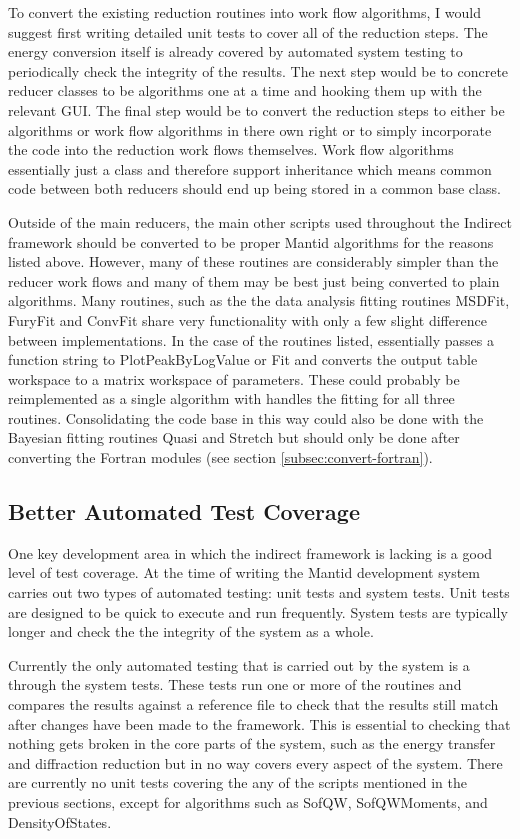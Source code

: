 \documentclass[paper=a4, fontsize=11pt]{scrartcl}	%
\numberwithin{equation}{section}															%
\numberwithin{figure}{section}																%
\numberwithin{table}{section}																%
\begin{document}
To convert the existing reduction routines into work flow algorithms, I would suggest first writing detailed unit tests to cover all of the reduction steps. The energy conversion itself is already covered by automated system testing to periodically check the integrity of the results. The next step would be to concrete reducer classes to be algorithms one at a time and hooking them up with the relevant GUI. The final step would be to convert the reduction steps to either be algorithms or work flow algorithms in there own right or to simply incorporate the code into the reduction work flows themselves. Work flow algorithms essentially just a class and therefore support inheritance which means common code between both reducers should end up being stored in a common base class.

Outside of the main reducers, the main other scripts used throughout the Indirect framework should be converted to be proper Mantid algorithms for the reasons listed above. However, many of these routines are considerably simpler than the reducer work flows and many of them may be best just being converted to plain algorithms. Many routines, such as the the data analysis fitting routines MSDFit, FuryFit and ConvFit share very functionality with only a few slight difference between implementations. In the case of the routines listed, essentially passes a function string to PlotPeakByLogValue or Fit and converts the output table workspace to a matrix workspace of parameters. These could probably be reimplemented as a single algorithm with handles the fitting for all three routines. Consolidating the code base in this way could also be done with the Bayesian fitting routines Quasi and Stretch but should only be done after converting the Fortran modules (see section \ref{subsec:convert-fortran}).

\subsection{Better Automated Test Coverage}
One key development area in which the indirect framework is lacking is a good level of test coverage. At the time of writing the Mantid development system carries out two types of automated testing: unit tests and system tests. Unit tests are designed to be quick to execute and run frequently. System tests are typically longer and check the the integrity of the system as a whole.

Currently the only automated testing that is carried out by the system is a through the system tests. These tests run one or more of the routines and compares the results against a reference file to check that the results still match after changes have been made to the framework. This is essential to checking that nothing gets broken in the core parts of the system, such as the energy transfer and diffraction reduction but in no way covers every aspect of the system. There are currently no unit tests covering the any of the scripts mentioned in the previous sections, except for algorithms such as SofQW, SofQWMoments, and DensityOfStates.
\end{document}
